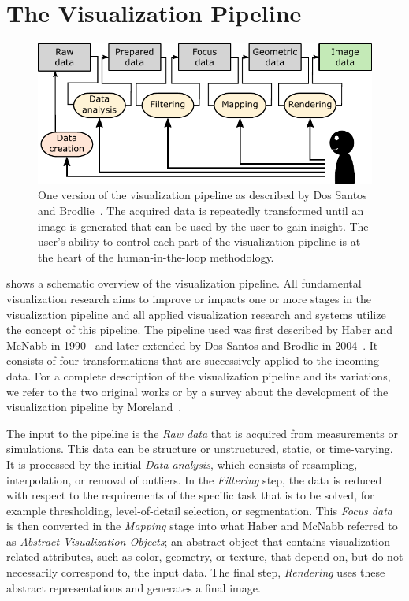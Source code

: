 \section{The Visualization Pipeline} \label{cha:intro:vp}
\begin{figure}
  \centering
  \includegraphics[width=\textwidth]{figures/intro/pipeline.pdf}
  \caption{One version of the visualization pipeline as described by Dos Santos and Brodlie~\cite{dos2004gaining}.  The acquired data is repeatedly transformed until an image is generated that can be used by the user to gain insight.  The user's ability to control each part of the visualization pipeline is at the heart of the human-in-the-loop methodology.}
  \label{fig:intro:vp}
\end{figure}

 shows a schematic overview of the visualization pipeline.  All fundamental visualization research aims to improve or impacts one or more stages in the visualization pipeline and all applied visualization research and systems utilize the concept of this pipeline.  The pipeline used was first described by Haber and McNabb in 1990~\cite{haber1990visualization} and later extended by Dos Santos and Brodlie in 2004~\cite{dos2004gaining}.  It consists of four transformations that are successively applied to the incoming data.  For a complete description of the visualization pipeline and its variations, we refer to the two original works or by a survey about the development of the visualization pipeline by Moreland~\cite{moreland2013survey}.

The input to the pipeline is the \emph{Raw data} that is acquired from measurements or simulations.  This data can be structure or unstructured, static, or time-varying.  It is processed by the initial \emph{Data analysis}, which consists of resampling, interpolation, or removal of outliers.  In the \emph{Filtering} step, the data is reduced with respect to the requirements of the specific task that is to be solved, for example thresholding, level-of-detail selection, or segmentation.  This \emph{Focus data} is then converted in the \emph{Mapping} stage into what Haber and McNabb referred to as \emph{Abstract Visualization Objects}; an abstract object that contains visualization-related attributes, such as color, geometry, or texture, that depend on, but do not necessarily correspond to, the input data.  The final step, \emph{Rendering} uses these abstract representations and generates a final image.%


